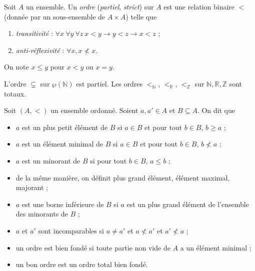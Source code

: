 \documentclass[./main]{subfiles}
\begin{document}
  \begin{defn}
    Soit $A$ un ensemble.
    Un \textit{ordre} (\textit{partiel}, \textit{strict}) sur $A$ est une relation binaire $<$ (donnée par un sous-ensemble de $A \times A$) telle que 
    \begin{enumerate}
      \item \textit{transitivité} : $\forall x \: \forall y \: \forall z \: x < y \to y < z \to x < z$ ;
      \item \textit{anti-réflexivité} : $\forall x, x \not< x$.
    \end{enumerate}
  \end{defn}

  \begin{nota}
    On note $x \le y$ pour $x < y$ ou $x = y$.
  \end{nota}

  \begin{exm}
    L'ordre $\subsetneq$ sur $\wp(\mathds{N})$ est partiel.
    Les ordres $<_\mathds{N}$, $<_\mathds{R}$, $<_\mathds{Z}$ sur $\mathds{N}, \mathds{R}, \mathds{Z}$ sont totaux.
  \end{exm}

  \begin{defn}
    Soit $(A, <)$ un ensemble ordonné. Soient  $a, a' \in A$ et $B \subseteq A$.
    On dit que 
    \begin{itemize}
      \item $a$ est un plus petit élément de $B$ si $a \in B$ et pour tout $b \in B$, $b \ge a$ ;
      \item $a$ est un élément minimal de $B$ si $a \in B$  et pour tout $b \in B$, $b \not< a$ ;
      \item $a$ est un minorant de $B$ si pour tout $b \in B$, $a \le b$ ;
      \item de la même manière, on définit plus grand élément, élément maximal, majorant ;
      \item $a$ est une borne inférieure de $B$ si $a$ est un plus grand élément de l'ensemble des minorants de $B$ ;
      \item $a$ et $a'$ sont incomparables si $a \neq a'$ et $a \not< a'$ et $a' \not< a$ ;
      \item un ordre est bien fondé si toute partie non vide de  $A$ a un élément minimal ;
      \item un bon ordre est un ordre total bien fondé.
    \end{itemize}
  \end{defn}
\end{document}
